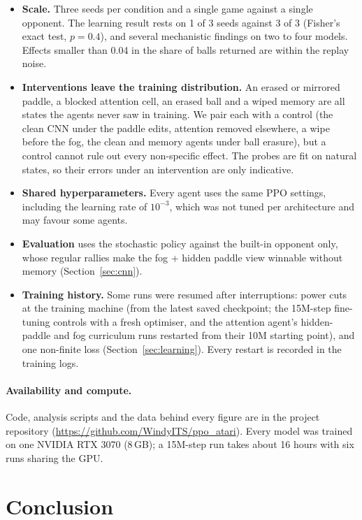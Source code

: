 \documentclass[11pt]{article}
\begin{document}
\begin{itemize}
  \item \textbf{Scale.} Three seeds per condition and a single game against a single opponent. The learning
    result rests on 1 of 3 seeds against 3 of 3 (Fisher's exact test, $p=0.4$), and several mechanistic
    findings on two to four models. Effects smaller than 0.04 in the share of balls returned are within the
    replay noise.
  \item \textbf{Interventions leave the training distribution.} An erased or mirrored paddle, a blocked
    attention cell, an erased ball and a wiped memory are all states the agents never saw in training. We
    pair each with a control (the clean CNN under the paddle edits, attention removed elsewhere, a wipe
    before the fog, the clean and memory agents under ball erasure), but a control cannot rule out every
    non-specific effect. The probes are fit on natural states, so their errors under an intervention are only
    indicative.
  \item \textbf{Shared hyperparameters.} Every agent uses the same PPO settings, including the learning rate
    of $10^{-3}$, which was not tuned per architecture and may favour some agents.
  \item \textbf{Evaluation} uses the stochastic policy against the built-in opponent only, whose regular
    rallies make the fog + hidden paddle view winnable without memory (Section~\ref{sec:cnn}).
  \item \textbf{Training history.} Some runs were resumed after interruptions: power cuts at the training
    machine (from the latest saved checkpoint; the 15M-step fine-tuning controls with a fresh optimiser, and
    the attention agent's hidden-paddle and fog curriculum runs restarted from their 10M starting point), and
    one non-finite loss (Section~\ref{sec:learning}). Every restart is recorded in the training logs.
\end{itemize}

\paragraph{Availability and compute.} Code, analysis scripts and the data behind every figure are in the
project repository (\url{https://github.com/WindyITS/ppo_atari}). Every model was trained on one NVIDIA RTX
3070 (8\,GB); a 15M-step run takes about 16 hours with six runs sharing the GPU.

\section{Conclusion}
\end{document}

